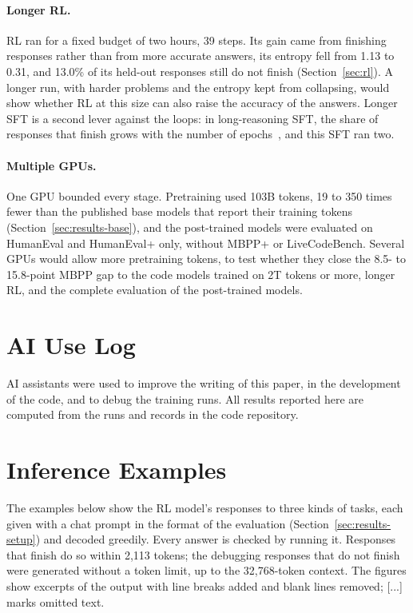\documentclass[sigconf,nonacm,balance=false]{acmart}
\begin{document}
\paragraph{Longer RL.} RL ran for a fixed budget of two hours, 39 steps. Its gain came from finishing responses rather
than from more accurate answers, its entropy fell from 1.13 to 0.31, and 13.0\% of its held-out responses still do not
finish (Section~\ref{sec:rl}). A longer run, with harder problems and the entropy kept from collapsing, would show
whether RL at this size can also raise the accuracy of the answers. Longer SFT is a second lever against the loops: in
long-reasoning SFT, the share of responses that finish grows with the number of epochs~\cite{kopiczko2026repetition},
and this SFT ran two.

\paragraph{Multiple GPUs.} One GPU bounded every stage. Pretraining used 103B tokens, 19 to 350 times fewer than the
published base models that report their training tokens (Section~\ref{sec:results-base}), and the post-trained models
were evaluated on HumanEval and HumanEval+ only, without MBPP+ or LiveCodeBench. Several GPUs would allow more
pretraining tokens, to test whether they close the 8.5- to 15.8-point MBPP gap to the code models trained on 2T tokens
or more, longer RL, and the complete evaluation of the post-trained models.

\section*{AI Use Log}

AI assistants were used to improve the writing of this paper, in the development of the code, and to debug the
training runs. All results reported here are computed from the runs and records in the code repository.




\appendix

\section{Inference Examples}
\label{sec:examples}

The examples below show the RL model's responses to three kinds of tasks, each given with a chat prompt in the format
of the evaluation (Section~\ref{sec:results-setup}) and decoded greedily. Every answer is checked by running it.
Responses that finish do so within 2,113 tokens; the debugging responses that do not finish were generated without a
token limit, up to the 32,768-token context. The figures show excerpts of the output with line breaks added and blank
lines removed; [...] marks omitted text.
\end{document}
